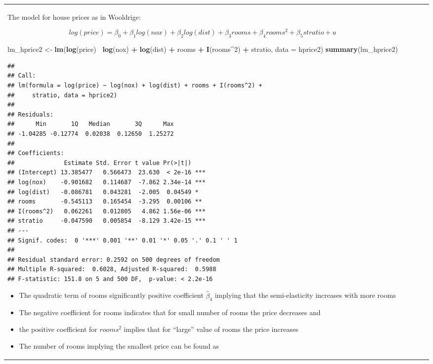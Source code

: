 \documentclass[]{book}
\newenvironment{Shaded}{\begin{snugshade}}{\end{snugshade}}
\newcommand{\DataTypeTok}[1]{\textcolor[rgb]{0.13,0.29,0.53}{#1}}
\newcommand{\DecValTok}[1]{\textcolor[rgb]{0.00,0.00,0.81}{#1}}
\newcommand{\KeywordTok}[1]{\textcolor[rgb]{0.13,0.29,0.53}{\textbf{#1}}}
\newcommand{\NormalTok}[1]{#1}
\newcommand{\OperatorTok}[1]{\textcolor[rgb]{0.81,0.36,0.00}{\textbf{#1}}}
\newcommand{\StringTok}[1]{\textcolor[rgb]{0.31,0.60,0.02}{#1}}
\providecommand{\tightlist}{%
  \setlength{\itemsep}{0pt}\setlength{\parskip}{0pt}}
\begin{document}
\begin{tabularx}{0.455555555555556\textwidth}{p{} p{} p{} p{} p{}}
The model for house prices as in Wooldrige:

\begin{equation}
log(price) = \beta_0 +  \beta_1 log(nox) + \beta_2 log(dist) + \beta_3 rooms + \beta_4 rooms^{2} + \beta_5 stratio + u 
\end{equation}

\begin{Shaded}
\begin{Highlighting}[]
\NormalTok{lm_hprice2 <-}\StringTok{ }\KeywordTok{lm}\NormalTok{(}\KeywordTok{log}\NormalTok{(price)}\OperatorTok{~}\StringTok{  }\KeywordTok{log}\NormalTok{(nox) }\OperatorTok{+}\StringTok{  }\KeywordTok{log}\NormalTok{(dist) }\OperatorTok{+}\StringTok{ }\NormalTok{rooms }\OperatorTok{+}\StringTok{ }\KeywordTok{I}\NormalTok{(rooms}\OperatorTok{^}\DecValTok{2}\NormalTok{) }\OperatorTok{+}\StringTok{ }\NormalTok{stratio, }\DataTypeTok{data =}\NormalTok{ hprice2)}
\KeywordTok{summary}\NormalTok{(lm_hprice2)}
\end{Highlighting}
\end{Shaded}

\begin{verbatim}
## 
## Call:
## lm(formula = log(price) ~ log(nox) + log(dist) + rooms + I(rooms^2) + 
##     stratio, data = hprice2)
## 
## Residuals:
##      Min       1Q   Median       3Q      Max 
## -1.04285 -0.12774  0.02038  0.12650  1.25272 
## 
## Coefficients:
##              Estimate Std. Error t value Pr(>|t|)    
## (Intercept) 13.385477   0.566473  23.630  < 2e-16 ***
## log(nox)    -0.901682   0.114687  -7.862 2.34e-14 ***
## log(dist)   -0.086781   0.043281  -2.005  0.04549 *  
## rooms       -0.545113   0.165454  -3.295  0.00106 ** 
## I(rooms^2)   0.062261   0.012805   4.862 1.56e-06 ***
## stratio     -0.047590   0.005854  -8.129 3.42e-15 ***
## ---
## Signif. codes:  0 '***' 0.001 '**' 0.01 '*' 0.05 '.' 0.1 ' ' 1
## 
## Residual standard error: 0.2592 on 500 degrees of freedom
## Multiple R-squared:  0.6028, Adjusted R-squared:  0.5988 
## F-statistic: 151.8 on 5 and 500 DF,  p-value: < 2.2e-16
\end{verbatim}

\begin{itemize}
\tightlist
\item
  The quadratic term of rooms significantly positive coefficient
  \(\hat\beta_4\) implying that the semi-elasticity increases with more
  rooms
\item
  The negative coefficient for rooms indicates that for small number of
  rooms the price decreases and
\item
  the positive coefficient for \(rooms^2\) implies that for ``large''
  value of rooms the price increases
\item
  The number of rooms implying the smallest price can be found as
\end{itemize}


\end{tabularx}
\end{document}
